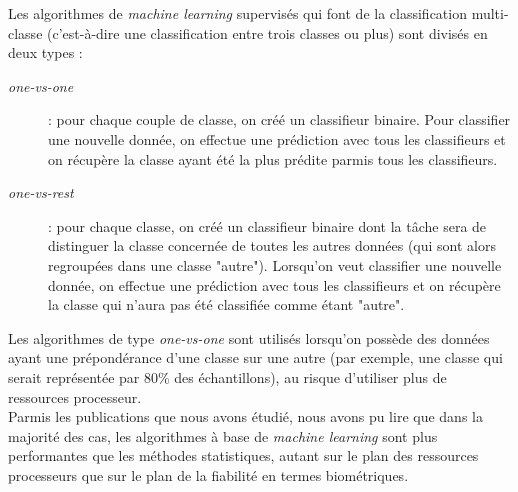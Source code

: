 Les algorithmes de \textit{machine learning} supervisés qui font de la classification multi-classe (c'est-à-dire une classification entre trois classes ou plus) sont divisés en deux types :\\


\begin{description}
  \item[\textit{one-vs-one}] : pour chaque couple de classe, on créé un classifieur binaire. Pour classifier une nouvelle donnée, on effectue une prédiction avec tous les classifieurs et on récupère la classe ayant été la plus prédite parmis tous les classifieurs.
  \item[\textit{one-vs-rest}] : pour chaque classe, on créé un classifieur binaire dont la tâche sera de distinguer la classe concernée de toutes les autres données (qui sont alors regroupées dans une classe "autre"). Lorsqu'on veut classifier une nouvelle donnée, on effectue une prédiction avec tous les classifieurs et on récupère la classe qui n'aura pas été classifiée comme étant "autre".\\
\end{description}

Les algorithmes de type \textit{one-vs-one} sont utilisés lorsqu'on possède des données ayant une prépondérance d'une classe sur une autre (par exemple, une classe qui serait représentée par 80\% des échantillons), au risque d'utiliser plus de ressources processeur.\\

Parmis les publications que nous avons étudié, nous avons pu lire que dans la majorité des cas, les algorithmes à base de \textit{machine learning} sont plus performantes que les méthodes statistiques, autant sur le plan des ressources processeurs\cite{Hu2008} que sur le plan de la fiabilité en termes biométriques\cite{giotBenchmark}.



